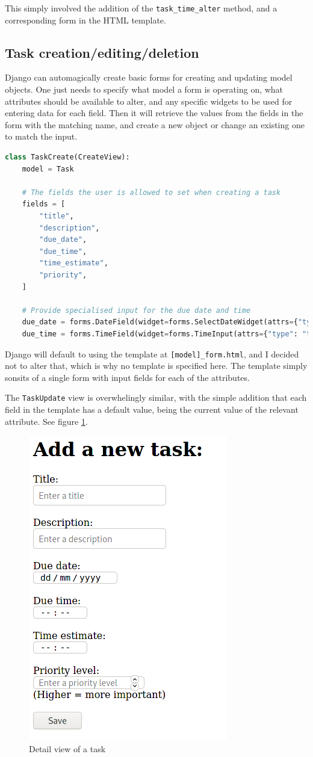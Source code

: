 \documentclass{article}
\begin{document}
This simply involved the addition of the \texttt{task\_time\_alter} method,
and a corresponding form in the HTML template.

\subsection{Task creation/editing/deletion}
Django can automagically create basic forms for creating and updating model objects.
One just needs to specify what model a form is operating on,
what attributes should be available to alter,
and any specific widgets to be used for entering data for each field.
Then it will retrieve the values from the fields in the form with the matching name,
and create a new object or change an existing one to match the input.

\begin{lstlisting}[language=Python]
class TaskCreate(CreateView):
    model = Task

    # The fields the user is allowed to set when creating a task
    fields = [
        "title",
        "description",
        "due_date",
        "due_time",
        "time_estimate",
        "priority",
    ]

    # Provide specialised input for the due date and time
    due_date = forms.DateField(widget=forms.SelectDateWidget(attrs={"type": "date"}))
    due_time = forms.TimeField(widget=forms.TimeInput(attrs={"type": "time"}))
\end{lstlisting}

Django will default to using the template at \texttt{[model]\_form.html},
and I decided not to alter that,
which is why no template is specified here.
The template simply sonsits of a single form with input fields for each of the attributes.

The \texttt{TaskUpdate} view is overwhelingly similar,
with the simple addition that each field in the template has a default value,
being the current value of the relevant attribute.
See figure \ref{fig:task_form1}.

\begin{figure}[H]
	\centering
	\includegraphics[width=0.5\linewidth]{Screenshots/task_form.png}
	\caption{Detail view of a task}
	\label{fig:task_form1}
\end{figure}
\end{document}
